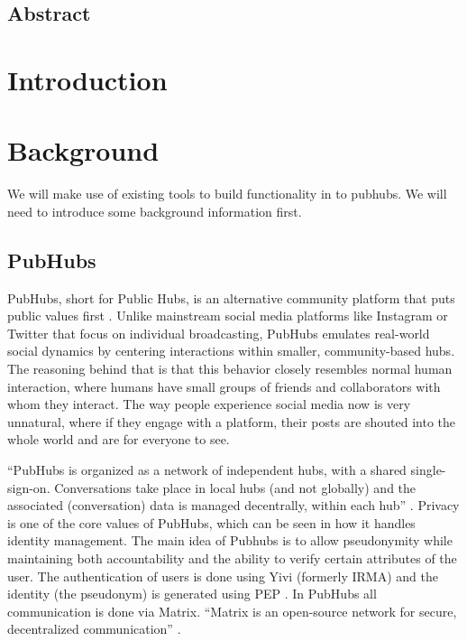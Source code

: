 \documentclass{report}
\begin{document}
    \tableofcontents

    \newpage
    \section*{Abstract}


    \chapter{Introduction}


    \chapter{Background}
    We will make use of existing tools to build functionality in to pubhubs. We will need to introduce some background
    information first.


    \section{PubHubs}
    PubHubs, short for Public Hubs, is an alternative community platform that puts public values first
    \cite{jacobs_pubhubs_2023}
    . Unlike mainstream social media platforms like Instagram or Twitter that focus on individual broadcasting, PubHubs
    emulates real-world social dynamics by centering interactions within smaller, community-based hubs. The reasoning
    behind that is that this behavior closely resembles normal human interaction, where humans have small groups of
    friends and collaborators with whom they interact. The way people experience social media now is very unnatural,
    where if they engage with a platform, their posts are shouted into the whole world and are for everyone to see.

    “PubHubs is organized as a network of independent hubs, with a shared single-sign-on. Conversations take place in
    local hubs (and not globally) and the associated (conversation) data is managed decentrally, within each hub”
    \cite{jacobs_pubhubs_2023}
    . Privacy is one of the core values of PubHubs, which can be seen in how it handles identity management. The main
    idea of Pubhubs is to allow pseudonymity while maintaining both accountability and the ability to verify certain
    attributes of the user. The authentication of users is done using Yivi (formerly IRMA)\cite{alpar_irma_nodate}
    and the identity (the pseudonym) is generated using PEP \cite{verheul_polymorphic_2016}
    . In PubHubs all communication is done via Matrix. “Matrix is an open-source network for secure, decentralized
    communication” \cite{noauthor_matrixorg_nodate}.
\end{document}
